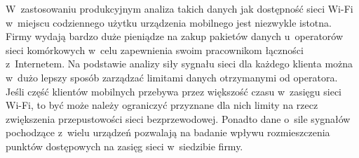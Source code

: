W~zastosowaniu produkcyjnym analiza takich danych jak dostępność sieci
Wi-Fi w~miejscu codziennego użytku urządzenia mobilnego jest niezwykle
istotna. Firmy wydają bardzo duże pieniądze na zakup pakietów danych
u~operatorów sieci komórkowych w~celu zapewnienia swoim pracownikom
łączności z~Internetem. Na podstawie analizy siły sygnału sieci dla
każdego klienta można w~dużo lepszy sposób zarządzać limitami danych
otrzymanymi od operatora. Jeśli część klientów mobilnych przebywa
przez większość czasu w~zasięgu sieci Wi-Fi, to być może należy
ograniczyć przyznane dla nich limity na rzecz zwiększenia
przepustowości sieci bezprzewodowej. Ponadto dane o~sile sygnałów
pochodzące z~wielu urządzeń pozwalają na badanie wpływu rozmieszczenia
punktów dostępowych na zasięg sieci w~siedzibie firmy.
